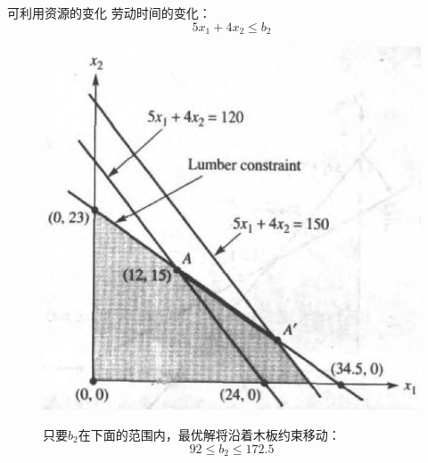 \documentclass[UTF8]{ctexbeamer}
\begin{document}
\begin{frame}{可利用资源的变化}
  劳动时间的变化：
  \[
  5x_1 + 4x_2 \le b_2
  \]

  \begin{figure}
    \begin{minipage}{.5\linewidth}
      \includegraphics[width=\textwidth{}]{labor.png}
    \end{minipage}%
    \begin{minipage}{.5\linewidth}
      只要$b_2$在下面的范围内，最优解将沿着木板约束移动：
      \[
      92 \le b_2 \le 172.5
      \]
    \end{minipage}
  \end{figure}  

\end{frame}
\end{document}
